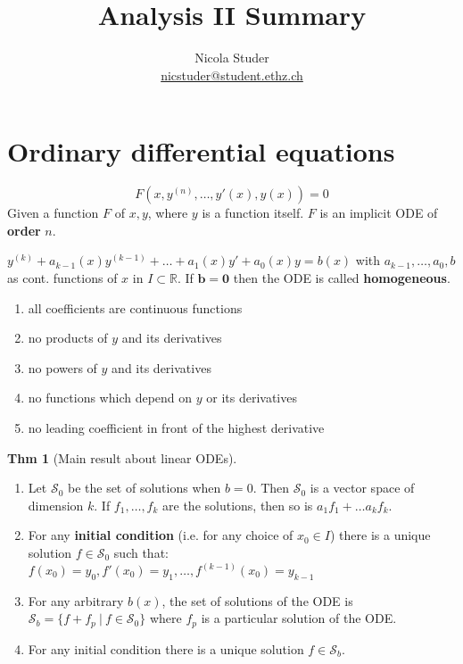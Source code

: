 \documentclass[a4paper, 10pt]{article}
\title{Analysis II Summary}
\author{Nicola Studer \\ \href{mailto:nicstuder@student.ethz.ch}{nicstuder@student.ethz.ch}}
\date{\vspace{-5ex}}
\theoremstyle{definition}
\newtheorem*{theorem}{Thm}
\newcommand{\R}{\mathbb{R}}
\begin{document}
\maketitle

\section{Ordinary differential equations}
\[F(x, y^{(n)}, \ldots, y'(x), y(x)) = 0\]
Given a function \(F\) of \(x, y\), where \(y\) is a function itself. \(F\) is an implicit ODE of \textbf{order} \(n\).

\begin{note*}
    \(y^{(k)} + a_{k-1}(x)y^{(k-1)} + \ldots + a_1(x)y' + a_0(x)y = b(x)\)
    with \(a_{k-1}, \ldots, a_0, b\) as cont. functions of \(x\) in \(I \subset \R\). If \(\bm{b = 0}\) then the ODE is called \textbf{homogeneous}.
\end{note*}

\begin{ntheorem*}
    \begin{enumerate}
        \item all coefficients are continuous functions
        \item no products of \(y\) and its derivatives
        \item no powers of \(y\) and its derivatives
        \item no functions which depend on \(y\) or its derivatives
        \item no leading coefficient in front of the highest derivative
    \end{enumerate}
\end{ntheorem*}

\begin{theorem}[Main result about linear ODEs]
    \(\;\)
    \begin{enumerate}
        \item Let \(\mathcal{S}_0\) be the set of solutions when \(b = 0\). Then \(\mathcal{S}_0\) is a vector space of dimension \(k\). If \(f_1, \ldots, f_k\) are the solutions, then so is \(a_1f_1+ \ldots a_kf_k\).
        \item For any \textbf{initial condition} (i.e. for any choice of \(x_0 \in I\)) there is a unique solution \(f \in \mathcal{S}_0\) such that: \\
        \(f(x_0) = y_0, f'(x_0) = y_1, \ldots, f^{(k-1)}(x_0) = y_{k-1}\)
        \item For any arbitrary \(b(x)\), the set of solutions of the ODE is \(\mathcal{S}_b = \{f + f_p \ | \ f \in \mathcal{S}_0\}\) where \(f_p\) is a particular solution of the ODE.
        \item For any initial condition there is a unique solution \(f \in \mathcal{S}_b\).
    \end{enumerate}
\end{theorem}
\end{document}
